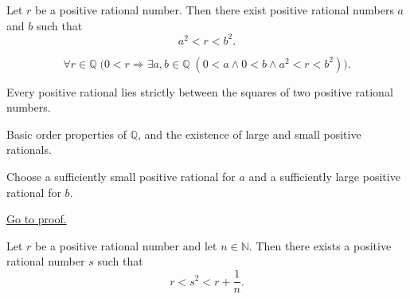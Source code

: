 \begin{tcolorbox}[colback=thmbox, colframe=thmborder, arc=2pt,
  left=6pt, right=6pt, top=4pt, bottom=4pt,
  title={\small\textbf{Lemma (Rational Square Bracketing)}},
  fonttitle=\small\bfseries]
\begin{lemma}
\label{lem:rational-square-bracketing}
Let $r$ be a positive rational number. Then there exist positive rational
numbers $a$ and $b$ such that
\[
a^2<r<b^2.
\]
\end{lemma}
\end{tcolorbox}

\begin{remark*}
\[
\forall r\in\mathbb{Q}\;
\bigl(
0<r \Longrightarrow \exists a,b\in\mathbb{Q}\;(0<a \land 0<b \land a^2<r<b^2)
\bigr).
\]
\end{remark*}

\begin{remark*}[Interpretation]
Every positive rational lies strictly between the squares of two positive
rational numbers.
\end{remark*}

\begin{remark*}[Dependencies]
Basic order properties of $\mathbb{Q}$, and the existence of large and small
positive rationals.
\end{remark*}

\begin{remark*}
Choose a sufficiently small positive rational for $a$ and a sufficiently large
positive rational for $b$.
\end{remark*}

\begin{remark*}[Proof]
\hyperref[prf:rational-square-bracketing]{Go to proof.}
\end{remark*}

\begin{tcolorbox}[colback=thmbox, colframe=thmborder, arc=2pt,
  left=6pt, right=6pt, top=4pt, bottom=4pt,
  title={\small\textbf{Theorem (Rational Square Approximation from Above)}},
  fonttitle=\small\bfseries]
\begin{theorem}
\label{thm:rational-square-approximation-from-above}
Let $r$ be a positive rational number and let $n\in\mathbb{N}$. Then there
exists a positive rational number $s$ such that
\[
r<s^2<r+\frac{1}{n}.
\]
\end{theorem}
\end{tcolorbox}

